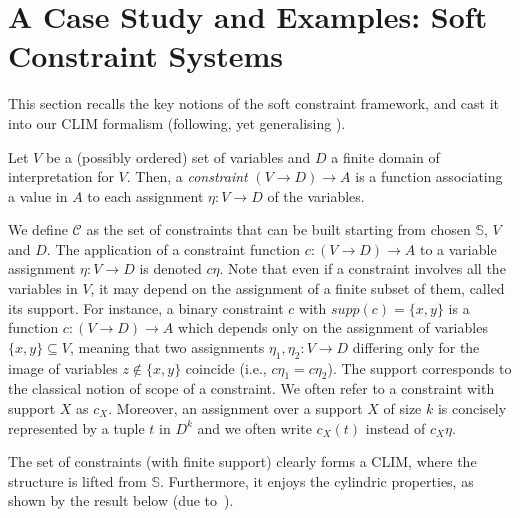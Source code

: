\documentclass[main.tex]{subfiles}
\begin{document}
\section{A Case Study and Examples: Soft Constraint Systems}\label{sec:softconstraints}
\label{subsec:inst} This section recalls
the key notions of the soft constraint framework, and cast it into our CLIM formalism
(following, yet generalising \cite{scc}).

\begin{definition}[Constraints]\label{def:softconstraints}
Let $V$ be a (possibly ordered)
set of variables and $D$ a finite domain of interpretation
for $V$. Then, a \emph{constraint} $(V \rightarrow D) \rightarrow
A$ is a function associating a value in $A$ to each assignment
$\eta: V\rightarrow D$ of the variables.
\end{definition}

We define ${\mathcal C}$ as the set of constraints that can be
built starting from chosen $\mathbb S$, $V$ and $D$. The application of a
constraint function $c:(V \rightarrow D) \rightarrow A$ to a variable
assignment $\eta:V\rightarrow D$ is denoted $c\eta$.  Note that even if
a constraint involves all the variables in $V$, it may depend on
the assignment of a finite subset of them, called its support. For
instance, a binary constraint $c$ with $supp(c)=\{x,y\}$ is a function
$c: (V\rightarrow D)\rightarrow A$ which depends only on the
assignment of variables $\{x,y\}\subseteq V$, meaning that two
assignments $\eta_1, \eta_2: V \rightarrow D$ differing only for the
image of variables $z \not \in \{x,y\}$ coincide (i.e., $c\eta_1 =
c\eta_2$).
%
The support corresponds to the classical notion of scope of a
constraint.  We often refer to a constraint with support $X$ as $c_X$.
Moreover, an assignment over a support $X$ of size $k$ is concisely
represented by a tuple $t$ in $D^k$ and we often write $c_X(t)$
instead of $c_X\eta$.

\smallskip
The set of constraints (with finite support) clearly forms a CLIM, where the structure
is lifted from ${\mathbb S}$.
%
Furthermore, it enjoys the cylindric properties, as shown by
the result below (due to~\cite{scc}).
\end{document}
